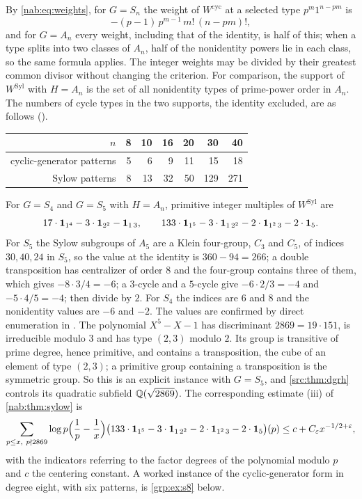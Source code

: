 By \eqref{nab:eq:weights}, for $G=S_n$ the weight of $W^{\mathrm{cyc}}$ at a selected type
$p^m1^{n-pm}$ is
\[
 -(p-1)\,p^{m-1}\,m!\,(n-pm)! ,
\]
and for $G=A_n$ every weight, including that of the identity, is half of this; when a type
splits into two classes of $A_n$, half of the nonidentity powers lie in each class, so the
same formula applies. The integer weights may be divided by their greatest common divisor
without changing the criterion. For comparison, the support of $W^{\mathrm{Syl}}$ with
$H=A_n$ is the set of all nonidentity types of prime-power order in $A_n$. The numbers of
cycle types in the two supports, the identity excluded, are as follows
().
\begin{center}
\begin{tabular}{rrrrrrr}\toprule
$n$ & 8 & 10 & 16 & 20 & 30 & 40\\\midrule
cyclic-generator patterns & 5 & 6 & 9 & 11 & 15 & 18\\
Sylow patterns & 8 & 13 & 32 & 50 & 129 & 271\\\bottomrule
\end{tabular}
\end{center}

\begin{example}\label{nab:ex:sylowsn}
For $G=S_4$ and $G=S_5$ with $H=A_n$, primitive integer multiples of
$W^{\mathrm{Syl}}$ are
\[
 17\cdot\mathbf{1}_{1^4}-3\cdot\mathbf{1}_{2^2}-\mathbf{1}_{1\,3},
 \qquad
 133\cdot\mathbf{1}_{1^5}-3\cdot\mathbf{1}_{1\,2^2}-2\cdot\mathbf{1}_{1^2\,3}-2\cdot\mathbf{1}_{5} .
\]
For $S_5$ the Sylow subgroups of $A_5$ are a Klein four-group, $C_3$ and $C_5$, of indices
$30,40,24$ in $S_5$, so the value at the identity is $360-94=266$; a double transposition
has centralizer of order $8$ and the four-group contains three of them, which gives
$-8\cdot3/4=-6$; a $3$-cycle and a $5$-cycle give $-6\cdot2/3=-4$ and $-5\cdot4/5=-4$; then
divide by $2$. For $S_4$ the indices are $6$ and $8$ and the nonidentity values are $-6$
and $-2$. The values are confirmed by direct enumeration in
. The polynomial $X^5-X-1$
has discriminant $2869=19\cdot151$, is irreducible modulo $3$ and has type $(2,3)$ modulo
$2$. Its group is transitive of prime degree, hence primitive, and contains a
transposition, the cube of an element of type $(2,3)$; a primitive group containing a
transposition is the symmetric group. So this is an explicit instance with $G=S_5$, and
\cref{src:thm:dgrh} controls its quadratic subfield $\mathbb{Q}(\sqrt{2869})$. The corresponding
estimate \textup{(iii)} of \cref{nab:thm:sylow} is
\[
 \sum_{p\le x,\ p\nmid2869}\log p\Bigl(\frac1p-\frac1x\Bigr)
 \bigl(133\cdot\mathbf{1}_{1^5}-3\cdot\mathbf{1}_{1\,2^2}-2\cdot\mathbf{1}_{1^2\,3}-2\cdot\mathbf{1}_{5}\bigr)(p)
 \le c+C_\varepsilon x^{-1/2+\varepsilon},
\]
with the indicators referring to the factor degrees of the polynomial modulo $p$ and $c$
the centering constant. A worked instance of the cyclic-generator form in degree eight,
with six patterns, is \cref{grp:ex:s8} below.
\end{example}

